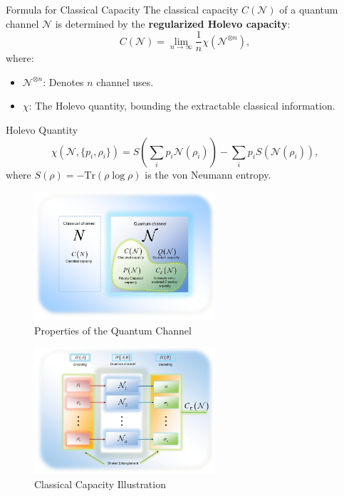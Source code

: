 \begin{frame}{Formula for Classical Capacity}
    The classical capacity \( C(\mathcal{N}) \) of a quantum channel \( \mathcal{N} \) is determined by the \textbf{regularized Holevo capacity}:
    \begin{equation}
        C(\mathcal{N}) = \lim_{n \to \infty} \frac{1}{n} \chi\left(\mathcal{N}^{\otimes n}\right),
    \end{equation}
    where:
    \begin{itemize}
        \item \( \mathcal{N}^{\otimes n} \): Denotes \( n \) channel uses.
        \item \( \chi \): The Holevo quantity, bounding the extractable classical information.
    \end{itemize}

    \begin{block}{Holevo Quantity}
        \[
        \chi(\mathcal{N}, \{p_i, \rho_i\}) = S\left(\sum_i p_i \mathcal{N}(\rho_i)\right) - \sum_i p_i S\left(\mathcal{N}(\rho_i)\right),
        \]
        where \( S(\rho) = -\text{Tr}(\rho \log \rho) \) is the von Neumann entropy.
    \end{block}
\end{frame}

\begin{frame}
    \begin{figure}[h]
        \centering
        \includegraphics[width=0.6\textwidth]{figures/properties_channels.png}
        \caption{Properties of the Quantum Channel \cite{Gyongyosi2012PropertiesOT}}
    \end{figure}
\end{frame}

\begin{frame}
    \begin{figure}[h]
        \centering
        \includegraphics[width=0.6\textwidth]{figures/classical_cap.png}
        \caption{Classical Capacity Illustration \cite{6773024}}
    \end{figure}
\end{frame}
